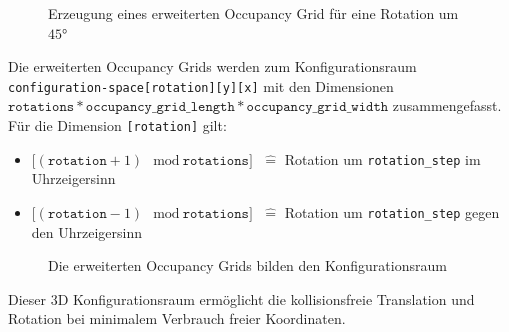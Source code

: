 \begin{figure}[h!]
	\centering
	\footnotesize
	\centerline{\resizebox{0.9\linewidth}{!}{}}
	\caption{Erzeugung eines erweiterten Occupancy Grid für eine Rotation um $45$°}
\end{figure}


Die erweiterten Occupancy Grids werden zum Konfigurationsraum \texttt{configuration-space[rotation][y][x]} mit den Dimensionen $\texttt{rotations} * \texttt{occupancy\_grid\_length} * \texttt{occupancy\_grid\_width}$ zusammengefasst. Für die Dimension \texttt{[rotation]} gilt:
\begin{itemize}
\item $\text{[}(\texttt{rotation} + 1) \mod \texttt{rotations]}$ $\widehat{=}$ Rotation um \texttt{rotation\_step} im Uhrzeigersinn
\item $\text{[}(\texttt{rotation} - 1) \mod \texttt{rotations]}$ $\widehat{=}$ Rotation um \texttt{rotation\_step} gegen den Uhrzeigersinn
\end{itemize}

\begin{figure}[h!]
	\centering
	\footnotesize
	\centerline{}
	\caption{Die erweiterten Occupancy Grids bilden den Konfigurationsraum}
\end{figure}

Dieser 3D Konfigurationsraum ermöglicht die kollisionsfreie Translation und Rotation bei minimalem Verbrauch freier Koordinaten.
